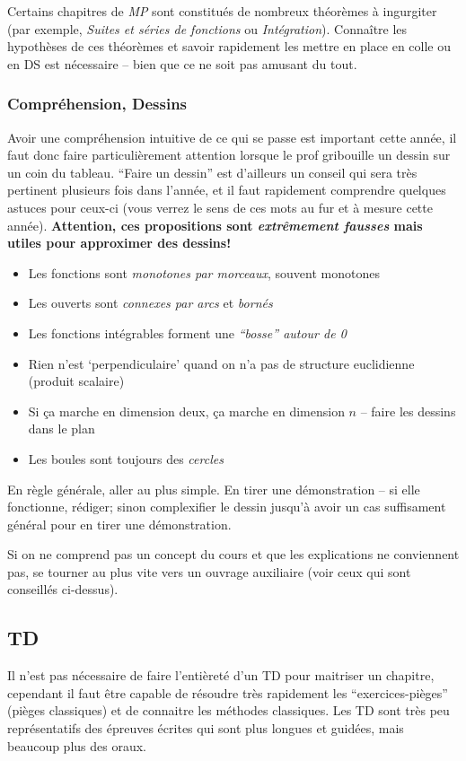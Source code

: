 \documentclass{article}
\begin{document}
Certains chapitres de \textit{MP} sont constitués de nombreux théorèmes à ingurgiter (par exemple, \textit{Suites et séries de fonctions} ou \textit{Intégration}).
Connaître les hypothèses de ces théorèmes et savoir rapidement les mettre en place en colle ou en DS est nécessaire -- bien que ce ne soit pas amusant du tout.

\subsubsection{Compréhension, Dessins}
Avoir une compréhension intuitive de ce qui se passe est important cette année, il faut donc faire particulièrement attention lorsque le prof gribouille un dessin sur un coin du tableau.
``Faire un dessin'' est d'ailleurs un conseil qui sera très pertinent plusieurs fois dans l'année, et il faut rapidement comprendre quelques astuces pour ceux-ci (vous verrez le sens de ces mots au fur et à mesure cette année).
\textbf{Attention, ces propositions sont \textit{extrêmement fausses} mais utiles pour approximer des dessins!}


\begin{itemize}
\item  Les fonctions sont \textit{monotones par morceaux}, souvent monotones
\item  Les ouverts sont \textit{connexes par arcs} et \textit{bornés}
\item  Les fonctions intégrables forment une \textit{``bosse'' autour de 0}
\item  Rien n'est `perpendiculaire' quand on n'a pas de structure euclidienne (produit scalaire)
\item  Si ça marche en dimension deux, ça marche en dimension $n$ -- faire les dessins dans le plan
\item  Les boules sont toujours des \textit{cercles}

\end{itemize}

En règle générale, aller au plus simple.
En tirer une démonstration -- si elle fonctionne, rédiger; sinon complexifier le dessin jusqu'à avoir un cas suffisament général pour en tirer une démonstration.

Si on ne comprend pas un concept du cours et que les explications ne conviennent pas, se tourner au plus vite vers un ouvrage auxiliaire (voir ceux qui sont conseillés ci-dessus).

\subsection{TD}
Il n'est pas nécessaire de faire l'entièreté d'un TD pour maitriser un chapitre, cependant il faut être capable de résoudre très rapidement les ``exercices-pièges'' (pièges classiques) et de connaitre les méthodes classiques.
Les TD sont très peu représentatifs des épreuves écrites qui sont plus longues et guidées, mais beaucoup plus des oraux.
\end{document}
